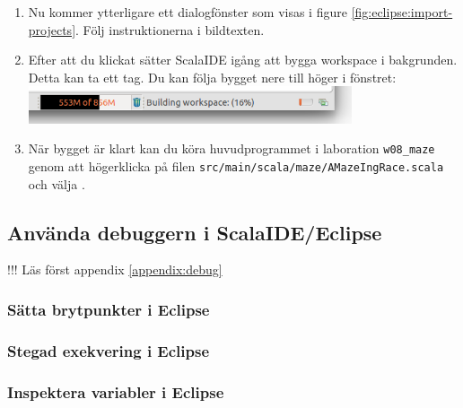 \begin{enumerate}
\item Nu kommer ytterligare ett dialogfönster som visas i figure \ref{fig:eclipse:import-projects}. Följ instruktionerna i bildtexten.


\item Efter att du klickat  sätter ScalaIDE igång att bygga workspace i bakgrunden. Detta kan ta ett tag. Du kan följa bygget nere till höger i fönstret:
\includegraphics[width=0.75\textwidth]{../img/eclipse/scalaide-import-progress.png}

\item När bygget är klart kan du köra huvudprogrammet i laboration \texttt{w08\_maze} genom att högerklicka på filen \texttt{src/main/scala/maze/AMazeIngRace.scala} och välja .




\end{enumerate}


\subsection{Använda debuggern i ScalaIDE/Eclipse}

!!! Läs först appendix \ref{appendix:debug}

\subsubsection{Sätta brytpunkter i Eclipse}\TODO
\subsubsection{Stegad exekvering i Eclipse}\TODO
\subsubsection{Inspektera variabler i Eclipse}\TODO
